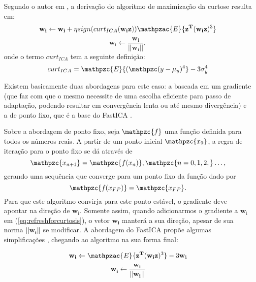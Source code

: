     Segundo o autor em \cite{LuizVictorio}, a derivação do algoritmo de maximização da curtose resulta em:
    \begin{equation}
        \mathbf{w_i} \leftarrow \mathbf{w_i} + \eta  sign(curt_{ICA}(\mathbf{w_iz}))\mathpzac{E}\{\mathbf{z^T}(\mathbf{w_iz})^3\}
        \label{eq:refreshforcurtosis}
    \end{equation}
    \begin{equation}
        \mathbf{w_i} \leftarrow \frac{\mathbf{w_i}}{|| \mathbf{w_i}||},
    \end{equation}
    onde o termo $curt_{ICA}$ tem a seguinte definição:
    \begin{equation}
        curt_{ICA} = \mathpzc{E}\{(\mathpzc(y - \mu_y)^4\} -3\sigma_y^4
    \end{equation}

    Existem basicamente duas abordagens para este caso: a baseada em um gradiente (que faz com que o mesmo necessite de uma escolha eficiente para passo de adaptação, podendo resultar em convergência lenta ou até mesmo divergência) e a de ponto fixo, que é a base do FastICA \cite{fastica1}. 
    
    Sobre a abordagem de ponto fixo, seja $\mathpzc{f}$ uma função definida para todos os números reais. A partir de um ponto inicial $\mathpzc{x_0}$, a regra de iteração para o ponto fixo se dá através de 
    \begin{equation}
        \mathpzc{x_{n+1}} = \mathpzc{f(x_n)}, \mathpzc{n = 0,1,2,}\dots,
    \end{equation}
    gerando uma sequência que converge para um ponto fixo da função dado por
    \begin{equation}
        \mathpzc{f(x_{FP})} = \mathpzc{x_{FP}}.
    \end{equation}
    Para que este algoritmo convirja para este ponto estável, o gradiente deve apontar na direção de $\mathbf{w_i}$. Somente assim, quando adicionarmos o gradiente a $\mathbf{w_i}$ em (\ref{eq:refreshforcurtosis}), o vetor $\mathbf{w_i}$ manterá a sua direção, apesar de sua norma $\mathbf{||w_i||}$ se modificar. A abordagem do FastICA propõe algumas simplificações \cite{fastica1}, chegando ao algoritmo na sua forma final:
    
    \begin{equation}
        \mathbf{w_i} \leftarrow \mathpzac{E}\{\mathbf{z^T}(\mathbf{w_iz})^3\} - 3\mathbf{w_i}
        \label{eq:ICAcurtosis}
    \end{equation}
     \begin{equation}
        \mathbf{w_i} \leftarrow \frac{\mathbf{w_i}}{||\mathbf{w_i}||}
        \label{eq:ICAcurtosismodulate}
    \end{equation}

